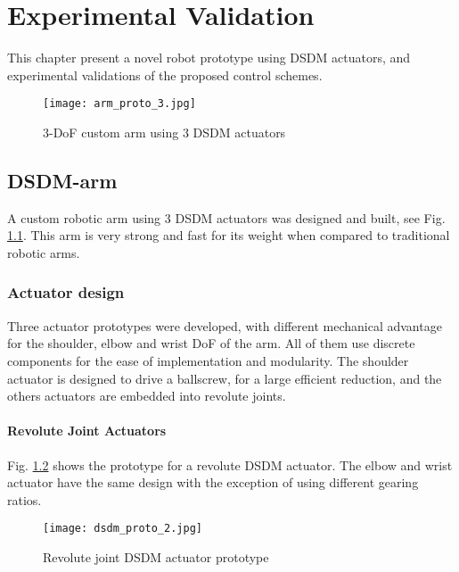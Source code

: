\chapter{Experimental Validation}
\label{sec:ExperimentalValidation}

This chapter present a novel robot prototype using DSDM actuators, and experimental validations of the proposed control schemes.


\begin{figure}[htp]
	\centering
		\texttt{[image: arm\_proto\_3.jpg]}
	\caption{3-DoF custom arm using 3 DSDM actuators}
	\label{fig:dsdm_arm}
\end{figure}


\section{DSDM-arm}
\label{sec:DSDMArm}

A custom robotic arm using 3 DSDM actuators was designed and built, see Fig. \ref{fig:dsdm_arm}. This arm is very strong and fast for its weight when compared to traditional robotic arms. 

\subsection{Actuator design}
\label{sec:ActuatorDesign}

Three actuator prototypes were developed, with different mechanical advantage for the shoulder, elbow and wrist DoF of the arm. All of them use discrete components for the ease of implementation and modularity. The shoulder actuator is designed to drive a ballscrew, for a large efficient reduction, and the others actuators are embedded into revolute joints. 

\subsubsection{Revolute Joint Actuators}

Fig. \ref{fig:dsdm_act} shows the prototype for a revolute DSDM actuator. The elbow and wrist actuator have the same design with the exception of using different gearing ratios.

\begin{figure}[htp]
	\centering
		\texttt{[image: dsdm\_proto\_2.jpg]}
	\caption{Revolute joint DSDM actuator prototype } %
	\label{fig:dsdm_act}
\end{figure}

